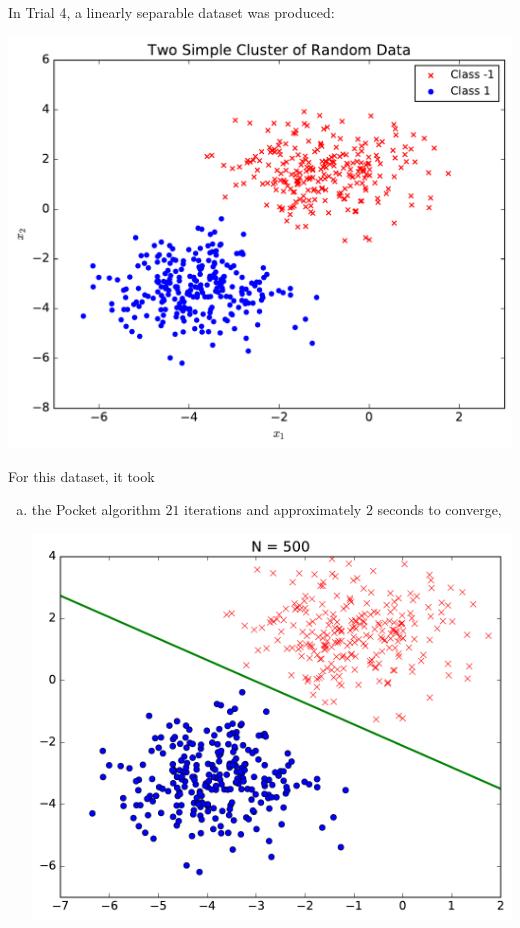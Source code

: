 \documentclass[a4paper]{article}
\begin{document}
\begin {description}
\begin{doublespace}
\newpage
In Trial 4, a linearly separable dataset was produced: 
\begin{center}
\includegraphics[scale=0.65]{Trial_4/hw3_plot.pdf}
\end{center}
For this dataset, it took
\begin{enumerate}[(a)]
\item the Pocket algorithm $21$ iterations and approximately $2$ seconds to converge,
\begin{center}
\includegraphics[scale=0.5]{Trial_4/pocket_learning.pdf}
\end{center}

\end{enumerate}
\end{doublespace}
\end{description}
\end{document}
